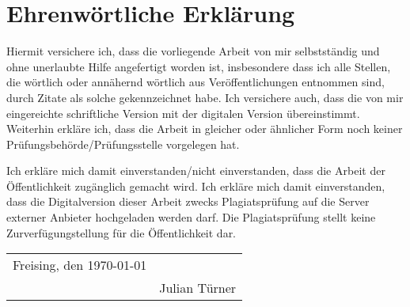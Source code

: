 \chapter*{Ehrenwörtliche Erklärung}
Hiermit versichere ich, dass die vorliegende Arbeit von mir selbstständig und ohne
unerlaubte Hilfe angefertigt worden ist, 
insbesondere dass ich alle Stellen, 
die wörtlich oder annähernd wörtlich aus Veröffentlichungen entnommen sind, durch Zitate
als solche gekennzeichnet habe. 
Ich versichere auch, dass die von mir eingereichte
schriftliche Version mit der digitalen Version übereinstimmt. 
Weiterhin erkläre ich,
dass die Arbeit in gleicher oder ähnlicher Form noch keiner Prüfungsbehörde/Prüfungsstelle vorgelegen hat. 

Ich erkläre mich damit einverstanden/nicht einverstanden, dass die Arbeit der Öffentlichkeit zugänglich gemacht wird. 
Ich erkläre mich damit einverstanden, dass die Digitalversion dieser Arbeit zwecks Plagiatsprüfung
auf die Server externer Anbieter hochgeladen werden darf. 
Die Plagiatsprüfung stellt keine Zurverfügungstellung für die Öffentlichkeit dar. 

\vspace{6cm}
\begin{tabular}{@{}p{6cm}p{6cm}@{}}
	Freising, den \today & \hrulefill \\
	& Julian Türner \\
	\end{tabular}